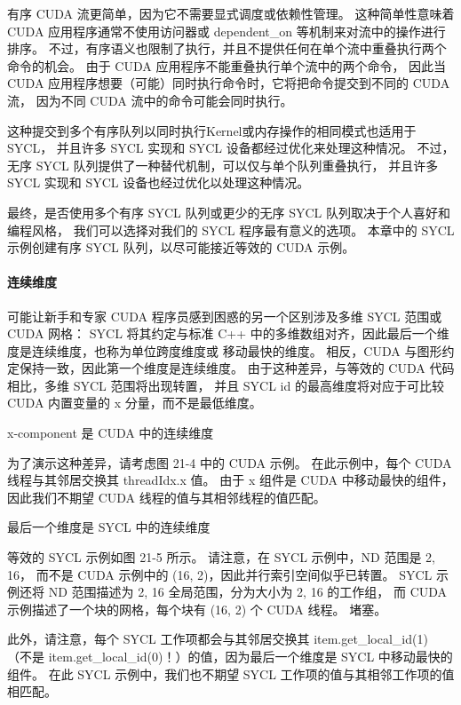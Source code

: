 有序 CUDA 流更简单，因为它不需要显式调度或依赖性管理。 
这种简单性意味着 CUDA 应用程序通常不使用访问器或 dependent\_on 等机制来对流中的操作进行排序。 
不过，有序语义也限制了执行，并且不提供任何在单个流中重叠执行两个命令的机会。 
由于 CUDA 应用程序不能重叠执行单个流中的两个命令，
因此当 CUDA 应用程序想要（可能）同时执行命令时，它将把命令提交到不同的 CUDA 流，
因为不同 CUDA 流中的命令可能会同时执行。

这种提交到多个有序队列以同时执行Kernel或内存操作的相同模式也适用于 SYCL，
并且许多 SYCL 实现和 SYCL 设备都经过优化来处理这种情况。 
不过，无序 SYCL 队列提供了一种替代机制，可以仅与单个队列重叠执行，
并且许多 SYCL 实现和 SYCL 设备也经过优化以处理这种情况。

最终，是否使用多个有序 SYCL 队列或更少的无序 SYCL 队列取决于个人喜好和编程风格，
我们可以选择对我们的 SYCL 程序最有意义的选项。 
本章中的 SYCL 示例创建有序 SYCL 队列，以尽可能接近等效的 CUDA 示例。

\paragraph{连续维度}

可能让新手和专家 CUDA 程序员感到困惑的另一个区别涉及多维 SYCL 范围或 CUDA 网格：
SYCL 将其约定与标准 C++ 中的多维数组对齐，因此最后一个维度是连续维度，也称为单位跨度维度或 移动最快的维度。 
相反，CUDA 与图形约定保持一致，因此第一个维度是连续维度。 
由于这种差异，与等效的 CUDA 代码相比，多维 SYCL 范围将出现转置，
并且 SYCL id 的最高维度将对应于可比较 CUDA 内置变量的 x 分量，而不是最低维度。

{\color{red} x-component 是 CUDA 中的连续维度}

为了演示这种差异，请考虑图 21-4 中的 CUDA 示例。 
在此示例中，每个 CUDA 线程与其邻居交换其 threadIdx.x 值。 
由于 x 组件是 CUDA 中移动最快的组件，因此我们不期望 CUDA 线程的值与其相邻线程的值匹配。

{\color{red} 最后一个维度是 SYCL 中的连续维度}

等效的 SYCL 示例如图 21-5 所示。 请注意，在 SYCL 示例中，ND 范围是 {2, 16}，
而不是 CUDA 示例中的 (16, 2)，因此并行索引空间似乎已转置。 
SYCL 示例还将 ND 范围描述为 {2, 16} 全局范围，分为大小为 {2, 16} 的工作组，
而 CUDA 示例描述了一个块的网格，每个块有 (16, 2) 个 CUDA 线程。 堵塞。

此外，请注意，每个 SYCL 工作项都会与其邻居交换其 item.get\_local\_id(1)
（不是 item.get\_local\_id(0)！）的值，因为最后一个维度是 SYCL 中移动最快的组件。 
在此 SYCL 示例中，我们也不期望 SYCL 工作项的值与其相邻工作项的值相匹配。


